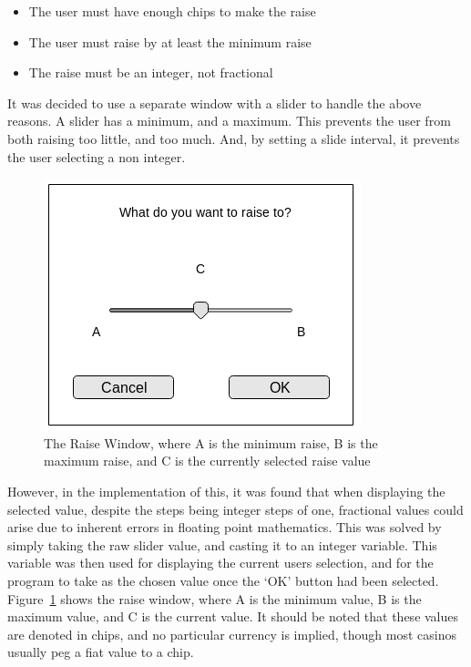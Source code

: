 \newpage

\begin{itemize}
\item The user must have enough chips to make the raise
\item The user must raise by at least the minimum raise
\item The raise must be an integer, not fractional
\end{itemize}

It was decided to use a separate window with a slider to handle the above
reasons. A slider has a minimum, and a maximum. This prevents the user from
both raising too little, and too much. And, by setting a slide interval, it
prevents the user selecting a non integer.

\begin{figure}[h]
    \centering
    \includegraphics[width=0.5\linewidth]{../images/raisewindow.png}
    \caption{The Raise Window, where A is the minimum raise, B is the maximum
             raise, and C is the currently selected raise value}%
    \label{fig:raisewindow}
\end{figure}

However, in the implementation of this, it was found that when displaying
the selected value, despite the steps being integer steps of one, 
fractional values could arise due to inherent errors in floating point 
mathematics. This was solved by simply taking the raw slider value, and 
casting it to an integer variable. This variable was then used for displaying 
the current users selection, and for the program to take as the chosen value 
once the `OK' button had been selected. Figure~\ref{fig:raisewindow} shows the 
raise window, where A is the minimum value, B is the maximum value, and C is 
the current value. It should be noted that these values are denoted in chips,
and no particular currency is implied, though most casinos usually peg a
fiat value to a chip.


